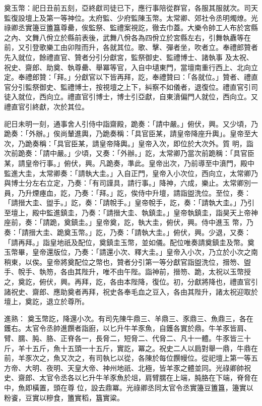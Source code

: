 \begin{pinyinscope}
 奠玉幣：祀日丑前五刻，亞終獻司徒已下，應行事陪從群官，各服其服就次。司天監復設壇上及第一等神位。太府監、少府監陳玉幣。太常卿、郊社令丞明燭燎。光祿卿丞實籩豆簠簋尊罍，俟監祭、監禮案視訖，徹去巾蓋。大樂令帥工人布於宮縣之內、文舞八佾立於縣前表後，武舞八佾各為四佾立於宮縣左右，引舞執纛等在前，又引登歌樂工由卯陛而升，各就其位。歌、擊、彈者坐，吹者立。奉禮郎贊者先入就位，餘禮直官、贊者分引分獻宮，監祭御史、監禮博士、諸執事
 及太祝、祝史、齋郎、助奠、執尊罍、舉冪等官，入自中壝東門，當壇南重行西上、北向立定。奉禮郎贊：「拜。」分獻官以下皆再拜，訖，奉禮贊曰：「各就位。」贊者、禮直官分引監祭御史、監禮博士，按視壇之上下，糾察不如儀者，退復位。禮直官引司徒入就位，西向立。禮直官引博士，博士引亞獻，自東濆偏門人就位，西向立。又禮直官引終獻，次於其位。



 祀日未明一刻，通事舍人引侍中詣齋殿，跪奏：「請中嚴。」俯伏，興。又少頃，乃跪奏：「外辦。」俟尚輦進輿，乃跪奏稱：「具官臣某，請皇帝降座升輿」。皇帝至大次，乃跪奏稱：「具官臣某，請皇帝降輿。」皇帝入次，即位於大次外。質
 明，詣次前跪奏：「請中嚴。」少頃，又奏：「外辦。」訖，太常卿乃當次前跪稱：「具官臣某，請皇帝行事。」俯伏，興。凡跪奏，準此。皇帝出次，乃前導至中濆門，殿中監進大圭，太常卿奏：「請執大圭。」入自正門，皇帝入小次位，西向立，太常卿乃與博士分左右立定，乃奏：「有司謹具，請行事。」降神，六成，樂止。太常卿別一員，乃升煙瘞血，訖，乃奏：「拜。」訖，俟侍中升壇，請詣盥洗位。至位，奏：「請搢大圭、盥手。」訖，奏：「請帨手。」皇帝帨手，訖，奏：「請執大圭。」乃引至壇上，殿中監進鎮圭，乃奏：「請搢大圭、執鎮圭。」皇帝執鎮圭，詣昊天上帝神座前，奏：「請跪，奠鎮圭。」皇帝奠，訖，執大圭，俯伏，興。侍中進玉
 幣，乃奏：「請搢大圭、跪奠玉幣。」訖，乃奏：「請執大圭。」俯伏，興。少退，又奏：「請再拜。」詣皇地祇及配位，奠鎮圭玉幣，並如儀。配位唯奏請奠鎮圭及幣。奠玉幣畢，皇帝還版位，乃奏：「請還小次、釋大圭。」皇帝入小次，乃立於小次之南稍東，以俟。皇帝將奠配位之幣也，贊者分引第一等分獻官詣盥洗位，搢笏、盥手、帨手、執笏，各由其陛升，唯不由午陛。詣神前，搢笏、跪，太祝以玉幣授之，奠訖，俯伏，興。再拜，訖，各由本陛降，復位。初，分獻將降也，禮直官引諸祝史、齋郎、應助奠者再拜，祝史各奉毛血之豆入，各由其陛升，諸太祝迎取於壇上，奠訖，退立於尊所。



 進熟：
 奠玉幣訖，降還小次。有司先陳牛鼎三、羊鼎三、豕鼎三、魚鼎三，各在鑊右。太官令丞帥進饌者詣廚，以匕升牛羊豕魚，自鑊各實於鼎。牛羊豕皆肩、臂、臑、肫、胳、正脊各一，長脅二，短脅二、代脅二、凡十一體。牛豕皆三十斤，羊十五斤，魚十五頭一十五斤，實訖，冪之。祝史二人以扃對舉一鼎，牛鼎在前，羊豕次之，魚又次之，有司執匕以從，各陳於每位饌幔位。從祀壇上第一等五方帝、大明、夜明、天皇大帝、神州地祇、北極，皆羊豕之體並同。光祿卿帥祝史、齋郎、太官令丞各以匕升牛羊豕魚於俎，肩臂臑在上端，肫胳在下端，脊脅在中，魚即橫置，頭在尊
 位，設去鼎冪。光祿卿丞同太官令丞實籩豆簠簋，籩實以粉餈，豆實以糝食，簠實稻，簋實粱。




\end{pinyinscope}
